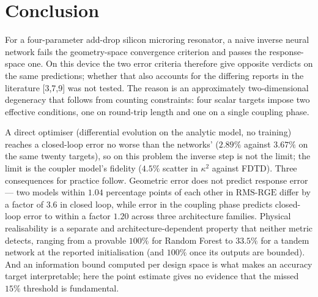 \documentclass[11pt]{article}
\newcommand{\rge}{\mathrm{RMS\text{-}RGE}}
\begin{document}
\section{Conclusion}

For a four-parameter add-drop silicon microring resonator, a naive inverse
neural network fails the geometry-space convergence criterion and passes the
response-space one. On this device the two error criteria therefore give opposite verdicts on the same predictions; whether that also accounts for the differing reports in the literature [3,7,9] was not tested. The reason is an approximately two-dimensional degeneracy
that follows from counting constraints: four scalar targets impose two
effective conditions, one on round-trip length and one on a single coupling
phase.

A direct optimiser (differential evolution on the analytic model, no training) reaches a closed-loop error no worse than the networks' ($2.89\%$ against $3.67\%$ on the same twenty targets), so on this problem the inverse step is not the limit; the limit is the coupler model's fidelity ($4.5\%$ scatter in $\kappa^2$ against FDTD). Three consequences for practice follow. Geometric error does not predict
response error --- two models within $1.04$ percentage points of each other in
$\rge$ differ by a factor of $3.6$ in closed loop, while error in the coupling
phase predicts closed-loop error to within a factor $1.20$ across three
architecture families. Physical realisability is a separate and
architecture-dependent property that neither metric detects, ranging from a
provable $100\%$ for Random Forest to $33.5\%$ for a tandem network at the reported initialisation (and $100\%$ once its outputs are bounded). And an
information bound computed per design space is what makes an accuracy target
interpretable; here the point estimate gives no evidence that the missed $15\%$ threshold is fundamental.
\end{document}
